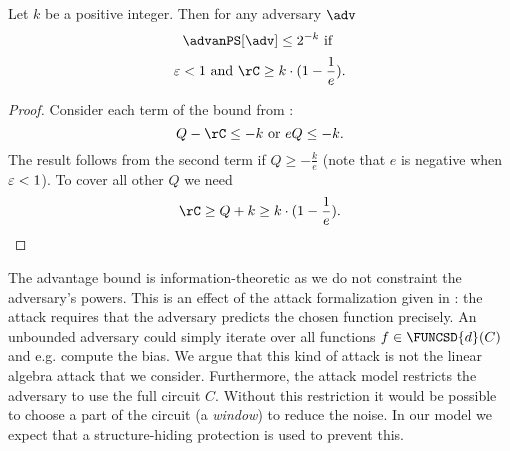 \begin{corollary}
Let $k$ be a positive integer. Then for any  adversary $\adv$
$$\advanPS[\adv] \le 2^{-k} \text{~if~}$$
$$\maxcor < 1 ~\text{and}~ \rC \ge k\cdot(1-\frac{1}{e}).$$
\end{corollary}

\begin{proof}
    Consider each term of the bound from :
    $$
    Q - \rC \le -k
    \text{~or~}
    eQ \le -k.
    $$
    The result follows from the second term if $Q \ge -\frac{k}{e}$ (note that $e$ is negative when $\varepsilon < 1$).
    To cover all other $Q$ we need
    $$
    \rC \ge Q + k \ge k\cdot(1 - \frac{1}{e}).
    $$
\end{proof}
\begin{remark}
The advantage bound is information-theoretic as we do not constraint the adversary's powers. This is an effect of the attack formalization given in : the attack requires that the adversary predicts the chosen function precisely. An unbounded adversary could simply iterate over all functions $f \in \FUNCSD{d}(C)$ and e.g. compute the bias. We argue that this kind of attack is not the linear algebra attack that we consider. Furthermore, the attack model restricts the adversary to use the full circuit $C$. Without this restriction it would be possible to choose a part of the circuit (a \emph{window}) to reduce the noise. In our model we expect that a structure-hiding protection is used to prevent this. 
\end{remark}